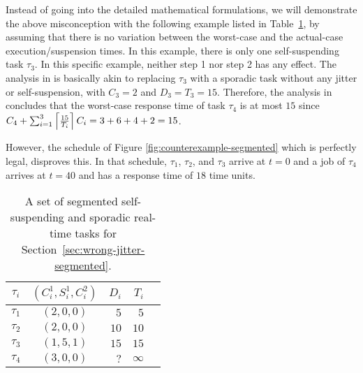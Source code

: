 Instead of going into the detailed mathematical formulations, we will demonstrate the above misconception with the following example listed in Table~\ref{tab:counterexample-segmented}, by assuming that there is no variation between the worst-case and the actual-case execution/suspension times.
In this example, there is only one self-suspending task $\tau_3$. In this specific example,  neither step 1 nor step 2 has any effect. The analysis in \cite{RTCSA-BletsasA05} is basically akin to replacing $\tau_3$ with a sporadic task without any jitter or self-suspension, with $C_3=2$ and $D_3=T_3=15$. Therefore, the analysis in \cite{RTCSA-BletsasA05}  concludes that the worst-case response time of task $\tau_4$ is at most $15$ since $C_4+\sum_{i=1}^{3}\left\lceil{\frac{15}{T_i}}\right\rceil C_i = 3+ 6 + 4 + 2= 15$.


However, the schedule of Figure \ref{fig:counterexample-segmented} which is perfectly legal, disproves this.
In that schedule, $\tau_1$, $\tau_2$, and $\tau_3$ arrive at $t=0$ and a job of $\tau_4$ arrives at $t=40$ and has a response time of 
$18$ time units.

\begin{table}[t]
\begin{center}
\begin{tabular}{|c||c|r|r|r|}
\hline
$\tau_i$ & $(C_i^1, S_i^1, C_i^2)$   &   $D_i$  &     $T_i$     \\ \hline
$\tau_1$ &  $(2, 0, 0)$                    &     $5$  &       $5$     \\ \hline
$\tau_2$ &  $(2, 0, 0)$                    &    $10$  &      $10$     \\ \hline
$\tau_3$ &  $(1, 5, 1)$            &    $15$  &      $15$     \\ \hline
$\tau_4$ &  $(3, 0, 0)$                   &    $?$  &   $\infty$    \\ \hline     
\end{tabular}
\end{center}
\caption{A set of segmented self-suspending and sporadic real-time tasks for Section~\ref{sec:wrong-jitter-segmented}.}
\label{tab:counterexample-segmented}
\end{table}

